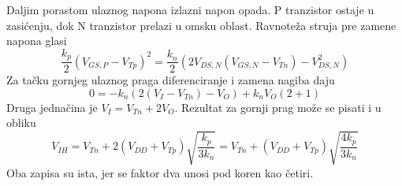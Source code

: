 Daljim porastom ulaznog napona izlazni napon opada. P tranzistor ostaje u zasićenju, dok N tranzistor prelazi u omsku oblast. Ravnoteža struja pre zamene napona glasi
\[\frac{k_p}2(V_{GS,P}-V_{Tp})^2=\frac{k_n}2\left(2V_{DS,N}(V_{GS,N}-V_{Tn})-V_{DS,N}^2\right)\]
Za tačku gornjeg ulaznog praga diferenciranje i zamena nagiba daju
\[0=-k_n\left(2(V_I-V_{Tn})-V_O\right)+k_nV_O(2+1)\]
Druga jednačina je $V_I=V_{Tn}+2V_O$. Rezultat za gornji prag može se pisati i u obliku
\[V_{IH}=V_{Tn}+2(V_{DD}+V_{Tp})\sqrt{\frac{k_p}{3k_n}}=V_{Tn}+(V_{DD}+V_{Tp})\sqrt{\frac{4k_p}{3k_n}}\]
Oba zapisa su ista, jer se faktor dva unosi pod koren kao četiri.
